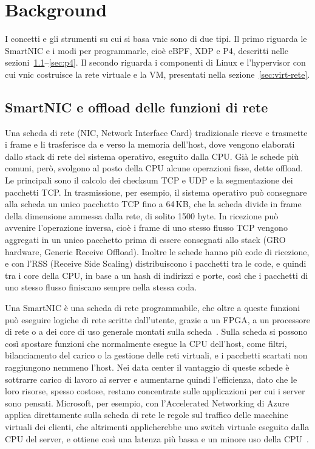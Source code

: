 \chapter{Background}\label{ch:background}

I concetti e gli strumenti su cui si basa vnic sono di due tipi. Il primo riguarda le SmartNIC e i modi per programmarle, cioè eBPF, XDP e P4, descritti nelle sezioni~\ref{sec:smartnic}--\ref{sec:p4}. Il secondo riguarda i componenti di Linux e l'hypervisor con cui vnic costruisce la rete virtuale e la VM, presentati nella sezione~\ref{sec:virt-rete}.

\section{SmartNIC e offload delle funzioni di rete}\label{sec:smartnic}

Una scheda di rete (NIC, Network Interface Card) tradizionale riceve e trasmette i frame e li trasferisce da e verso la memoria dell'host, dove vengono elaborati dallo stack di rete del sistema operativo, eseguito dalla CPU. Già le schede più comuni, però, svolgono al posto della CPU alcune operazioni fisse, dette offload. Le principali sono il calcolo dei checksum TCP e UDP e la segmentazione dei pacchetti TCP. In trasmissione, per esempio, il sistema operativo può consegnare alla scheda un unico pacchetto TCP fino a 64\,KB, che la scheda divide in frame della dimensione ammessa dalla rete, di solito 1500 byte. In ricezione può avvenire l'operazione inversa, cioè i frame di uno stesso flusso TCP vengono aggregati in un unico pacchetto prima di essere consegnati allo stack (GRO hardware, Generic Receive Offload). Inoltre le schede hanno più code di ricezione, e con l'RSS (Receive Side Scaling) distribuiscono i pacchetti tra le code, e quindi tra i core della CPU, in base a un hash di indirizzi e porte, così che i pacchetti di uno stesso flusso finiscano sempre nella stessa coda.

Una SmartNIC è una scheda di rete programmabile, che oltre a queste funzioni può eseguire logiche di rete scritte dall'utente, grazie a un FPGA, a un processore di rete o a dei core di uso generale montati sulla scheda~\cite{nvidia-smartnic}. Sulla scheda si possono così spostare funzioni che normalmente esegue la CPU dell'host, come filtri, bilanciamento del carico o la gestione delle reti virtuali, e i pacchetti scartati non raggiungono nemmeno l'host. Nei data center il vantaggio di queste schede è sottrarre carico di lavoro ai server e aumentarne quindi l'efficienza, dato che le loro risorse, spesso costose, restano concentrate sulle applicazioni per cui i server sono pensati. Microsoft, per esempio, con l'Accelerated Networking di Azure applica direttamente sulla scheda di rete le regole sul traffico delle macchine virtuali dei clienti, che altrimenti applicherebbe uno switch virtuale eseguito dalla CPU del server, e ottiene così una latenza più bassa e un minore uso della CPU~\cite{azure-accelnet}.

